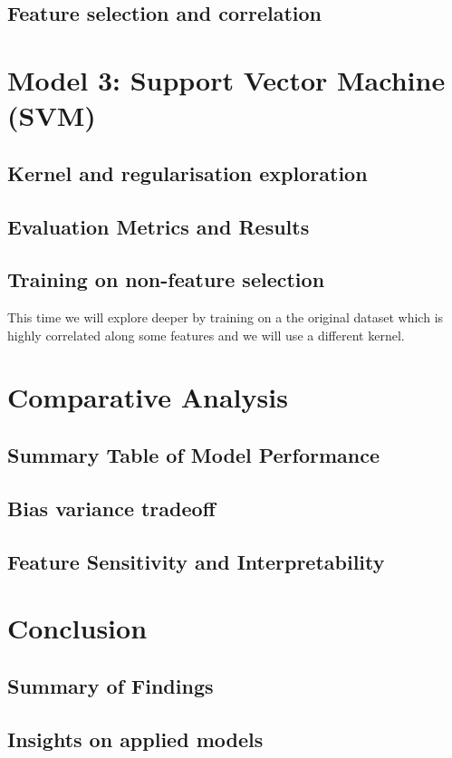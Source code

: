 \documentclass[12pt]{article}
\begin{document}
\subsection{Feature selection and correlation}

\section{Model 3: Support Vector Machine (SVM)}
\subsection{Kernel and regularisation exploration}
\subsection{Evaluation Metrics and Results}
\subsection{Training on non-feature selection}
This time we will explore deeper by training on a the original dataset which is highly correlated along some features and we will use a different kernel.

\section{Comparative Analysis}
\subsection{Summary Table of Model Performance}
\subsection{Bias variance tradeoff}
\subsection{Feature Sensitivity and Interpretability}


\section{Conclusion}
\subsection{Summary of Findings}
\subsection{Insights on applied models}
\end{document}
